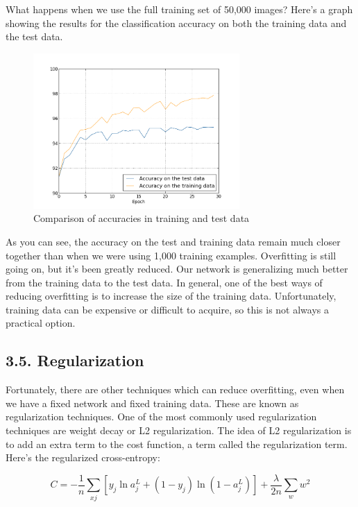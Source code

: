 \documentclass[12 pt]{article}
\begin{document}
What happens when we use the full training set of 50,000 images? Here's
a graph showing the results for the classification accuracy on both the
training data and the test data.

\begin{figure}[htp]
\centering
\includegraphics[width=0.7\textwidth]{./figs/overfitting_full.png}
\caption{Comparison of accuracies in training and test data}
\end{figure}

As you can see, the accuracy on the test and training data remain much
closer together than when we were using 1,000 training examples.
Overfitting is still going on, but it's been greatly reduced. Our
network is generalizing much better from the training data to the test
data. In general, one of the best ways of reducing overfitting is to
increase the size of the training data. Unfortunately, training data can
be expensive or difficult to acquire, so this is not always a practical
option.

\subsection{3.5. Regularization}\label{regularization}

Fortunately, there are other techniques which can reduce overfitting,
even when we have a fixed network and fixed training data. These are
known as regularization techniques. One of the most commonly used
regularization techniques are weight decay or L2 regularization. The
idea of L2 regularization is to add an extra term to the cost function,
a term called the regularization term. Here's the regularized
cross-entropy:

\begin{equation}
    C = -\frac{1}{n} \sum_{xj} \left [
    y_j \ln a^L_j + (1 - y_j) \ln (1 - a^L_j) \right ] +
    \frac{\lambda}{2n} \sum_w w^2
\end{equation}
\end{document}
